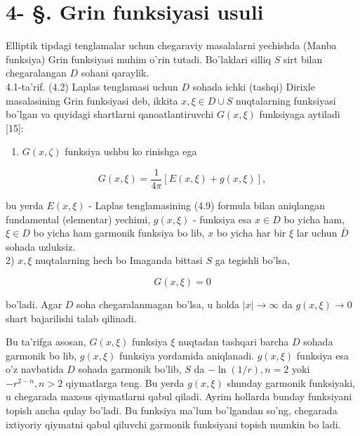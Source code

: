 \documentclass[10pt]{article}
\begin{document}
\captionsetup{singlelinecheck=false}
\section*{4- §. Grin funksiyasi usuli}
Elliptik tipdagi tenglamalar uchun chegaraviy masalalarni yechishda (Manba funksiya) Grin funksiyasi muhim oˋrin tutadi. Boˋlaklari silliq $S$ sirt bilan chegaralangan $D$ sohani qaraylik.\\
4.1-ta'rif. (4.2) Laplas tenglamasi uchun $D$ sohada ichki (tashqi) Dirixle masalasining Grin funksiyasi deb, ikkita $x, \xi \in D \cup S$ nuqtalarning funksiyasi boˋlgan va quyidagi shartlarni qanoatlantiruvchi $G(x, \xi)$ funksiyaga aytiladi [15]:

\begin{enumerate}
  \item $G(x, \zeta)$ funksiya ushbu ko rinishga ega
\end{enumerate}


\begin{equation*}
G(x, \xi)=\frac{1}{4 \pi}[E(x, \xi)+g(x, \xi)], \tag{4.56}
\end{equation*}


bu yerda $E(x, \xi)$ - Laplas tenglamasining (4.9) formula bilan aniqlangan fundamental (elementar) yechimi, $g(x, \xi)$ - funksiya esa $x \in D$ bo yicha ham, $\xi \in D$ bo yicha ham garmonik funksiya bo lib, $x$ bo yicha har bir $\xi$ lar uchun $\bar{D}$ sohada uzluksiz.\\
2) $x, \xi$ nuqtalarning hech bo Imaganda bittasi $S$ ga tegishli bo'lsa,


\begin{equation*}
G(x, \xi)=0 \tag{4.57}
\end{equation*}


bo'ladi. Agar $D$ soha chegaralanmagan bo'lsa, u holda $|x| \rightarrow \infty$ da $g(x, \xi) \rightarrow 0$ shart bajarilishi talab qilinadi.

Bu ta'rifga asosan, $G(x, \xi)$ funksiya $\xi$ nuqtadan tashqari barcha $D$ sohada garmonik bo lib, $g(x, \xi)$ funksiya yordamida aniqlanadi. $g(x, \xi)$ funksiya esa o'z navbatida $D$ sohada garmonik bo'lib, $S$ da $-\ln (1 / r), n=2$ yoki $-r^{2-n}, n>2$ qiymatlarga teng. Bu yerda $g(x, \xi)$ shunday garmonik funksiyaki, u chegarada maxsus qiymatlarni qabul qiladi. Ayrim hollarda bunday funksiyani topish ancha qulay bo'ladi. Bu funksiya maˋlum boˋlgandan so'ng, chegarada ixtiyoriy qiymatni qabul qiluvchi garmonik funksiyani topish mumkin bo ladi.
\end{document}
